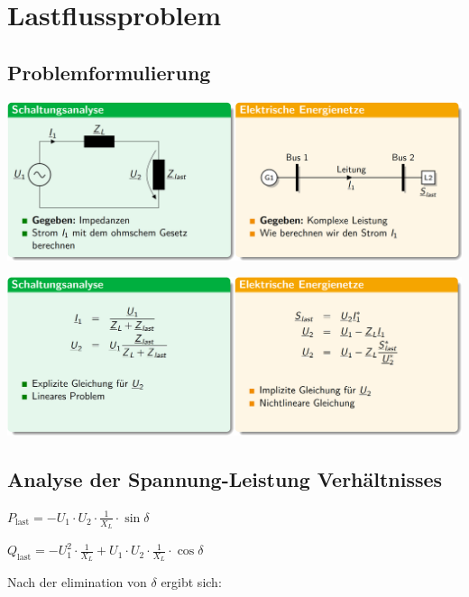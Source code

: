 \newcolumn
\section{Lastflussproblem}


\subsection{Problemformulierung}

\includegraphics[width=0.98\columnwidth, align=c]{images/Problemstellung_1.png}

\vspace{0.15cm}

\includegraphics[width=0.98\columnwidth, align=c]{images/Problemstellung_2.png}


\subsection{Analyse der Spannung-Leistung Verhältnisses}

$
\boxed{
P_{\text{last}} = -U_1 \cdot U_2 \cdot \frac{1}{X_L} \cdot \sin{\delta}
}
$

\vspace{0.15cm}

$
\boxed{
Q_{\text{last}} = -U_1^2 \cdot \frac{1}{X_L} + U_1 \cdot U_2 \cdot \frac{1}{X_L} \cdot \cos{\delta}
}
$

\vspace{0.15cm}

Nach der elimination von $\delta$ ergibt sich:

\vspace{0.15cm}

